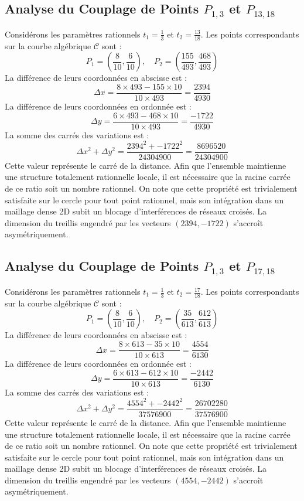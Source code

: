 \documentclass[12pt, a4paper]{article}
\begin{document}
\subsection{Analyse du Couplage de Points $P_{1,3}$ et $P_{13,18}$}
Considérons les paramètres rationnels $t_1 = \frac{1}{3}$ et $t_2 = \frac{13}{18}$.
Les points correspondants sur la courbe algébrique $\mathcal{C}$ sont :
$$ P_1 = \left( \frac{8}{10}, \frac{6}{10} \right), \quad P_2 = \left( \frac{155}{493}, \frac{468}{493} \right) $$
La différence de leurs coordonnées en abscisse est :
$$ \Delta x = \frac{8 \times 493 - 155 \times 10}{10 \times 493} = \frac{2394}{4930} $$
La différence de leurs coordonnées en ordonnée est :
$$ \Delta y = \frac{6 \times 493 - 468 \times 10}{10 \times 493} = \frac{-1722}{4930} $$
La somme des carrés des variations est :
$$ \Delta x^2 + \Delta y^2 = \frac{ 2394^2 + -1722^2 }{ 24304900 } = \frac{ 8696520 }{ 24304900 } $$
Cette valeur représente le carré de la distance. Afin que l'ensemble maintienne une structure totalement rationnelle locale, il est nécessaire que la racine carrée de ce ratio soit un nombre rationnel. On note que cette propriété est trivialement satisfaite sur le cercle pour tout point rationnel, mais son intégration dans un maillage dense 2D subit un blocage d'interférences de réseaux croisés. La dimension du treillis engendré par les vecteurs $( 2394, -1722 )$ s'accroît asymétriquement.


\subsection{Analyse du Couplage de Points $P_{1,3}$ et $P_{17,18}$}
Considérons les paramètres rationnels $t_1 = \frac{1}{3}$ et $t_2 = \frac{17}{18}$.
Les points correspondants sur la courbe algébrique $\mathcal{C}$ sont :
$$ P_1 = \left( \frac{8}{10}, \frac{6}{10} \right), \quad P_2 = \left( \frac{35}{613}, \frac{612}{613} \right) $$
La différence de leurs coordonnées en abscisse est :
$$ \Delta x = \frac{8 \times 613 - 35 \times 10}{10 \times 613} = \frac{4554}{6130} $$
La différence de leurs coordonnées en ordonnée est :
$$ \Delta y = \frac{6 \times 613 - 612 \times 10}{10 \times 613} = \frac{-2442}{6130} $$
La somme des carrés des variations est :
$$ \Delta x^2 + \Delta y^2 = \frac{ 4554^2 + -2442^2 }{ 37576900 } = \frac{ 26702280 }{ 37576900 } $$
Cette valeur représente le carré de la distance. Afin que l'ensemble maintienne une structure totalement rationnelle locale, il est nécessaire que la racine carrée de ce ratio soit un nombre rationnel. On note que cette propriété est trivialement satisfaite sur le cercle pour tout point rationnel, mais son intégration dans un maillage dense 2D subit un blocage d'interférences de réseaux croisés. La dimension du treillis engendré par les vecteurs $( 4554, -2442 )$ s'accroît asymétriquement.
\end{document}
